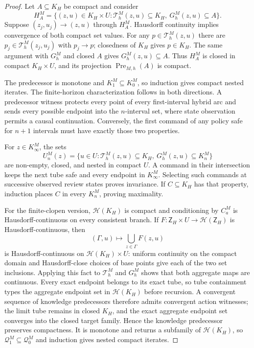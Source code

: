\documentclass[11pt]{article}
\theoremstyle{definition}
\newcommand{\Pre}{\operatorname{Pre}}
\begin{document}
\begin{proof}
Let $A\subseteq K_H$ be compact and consider
\[
H_A^M=\{(z,u)\in K_H\times U:
\mathscr T_h^M(z,u)\subseteq K_H,\ G_h^M(z,u)\subseteq A\}.
\]
Suppose $(z_j,u_j)\to(z,u)$ through $H_A^M$.  Hausdorff continuity implies
convergence of both compact set values.  For any
$p\in\mathscr T_h^M(z,u)$ there are
$p_j\in\mathscr T_h^M(z_j,u_j)$ with $p_j\to p$; closedness of $K_H$ gives
$p\in K_H$.  The same argument with $G_h^M$ and closed $A$ gives
$G_h^M(z,u)\subseteq A$.  Thus $H_A^M$ is closed in compact
$K_H\times U$, and its projection $\Pre_{M,h}(A)$ is compact.

The predecessor is monotone and $K_1^M\subseteq K_0^M$, so induction gives
compact nested iterates.  The finite-horizon characterization follows in
both directions.  A predecessor witness protects every point of every
first-interval hybrid arc and sends every possible endpoint into the
$n$-interval set, where state observation permits a causal continuation.
Conversely, the first command of any policy safe for $n+1$ intervals must
have exactly those two properties.

For $z\in K_\infty^M$, the sets
\[
U_n^M(z)=\{u\in U:\mathscr T_h^M(z,u)\subseteq K_H,
\ G_h^M(z,u)\subseteq K_n^M\}
\]
are non-empty, closed, and nested in compact $U$.  A command in their
intersection keeps the next tube safe and every endpoint in
$K_\infty^M$.  Selecting such commands at successive observed review
states proves invariance.  If $C\subseteq K_H$ has that property, induction
places $C$ in every $K_n^M$, proving maximality.

For the finite-clopen version, $\mathcal H(K_H)$ is compact and conditioning
by $C_a^M$ is Hausdorff-continuous on every consistent branch.  If
$F:\mathsf Z_H\times U\to\mathcal H(\mathsf Z_H)$ is Hausdorff-continuous,
then
\[
(\Gamma,u)\longmapsto\bigcup_{z\in\Gamma}F(z,u)
\]
is Hausdorff-continuous on $\mathcal H(K_H)\times U$: uniform continuity on
the compact domain and Hausdorff-close choices of base points give each of
the two set inclusions.  Applying this fact to $\mathscr T_h^M$ and $G_h^M$
shows that both aggregate maps are continuous.  Every exact endpoint belongs
to its exact tube, so tube containment types the aggregate endpoint set in
$\mathcal H(K_H)$ before recursion.  A convergent sequence of knowledge
predecessors therefore admits convergent action witnesses; the limit tube
remains in closed $K_H$, and the exact aggregate endpoint set converges into
the closed target family.  Hence the knowledge predecessor preserves compactness.  It is monotone and
returns a subfamily of $\mathcal H(K_H)$, so
$\mathcal Q_1^M\subseteq\mathcal Q_0^M$ and induction gives nested compact
iterates.


\end{proof}
\end{document}

